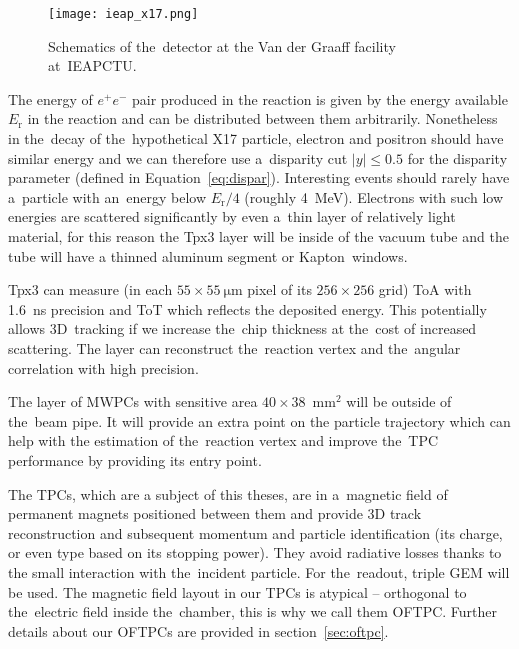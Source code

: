 			\begin{figure}
				\centering
				\texttt{[image: ieap\_x17.png]}
				\caption{Schematics of the~detector at the Van der Graaff facility at~\ac{IEAPCTU}.}
				\label{fig:ieap}
			\end{figure}
		
		The energy of $e^+e^-$ pair produced in the reaction is given by the energy available $E_\text{r}$ in the reaction and can be distributed between them arbitrarily. Nonetheless in the~decay of the~hypothetical X17 particle, electron and positron should have similar energy and we can therefore use a~disparity cut $|y| \leq 0.5$ for the disparity parameter (defined in Equation~\ref{eq:dispar}). Interesting events should rarely have a~particle with an~energy below $E_\text{r}/4$ (roughly 4~MeV). Electrons with such low energies are scattered significantly by even a~thin layer of relatively light material, for this reason the \ac{Tpx3} layer will be inside of the vacuum tube and the tube will have a thinned aluminum segment or Kapton\texttrademark\ windows.
		
		\ac{Tpx3} can measure (in each $55\times55~\mathrm{\mu m}$ pixel of its $256\times256$ grid) \ac{ToA} with 1.6~ns precision and \ac{ToT} which reflects the deposited energy. This potentially allows 3D~tracking if we increase the~chip thickness at the~cost of increased scattering. The layer can reconstruct the~reaction vertex and the~angular correlation with high precision.
		
		The layer of \ac{MWPC}s with sensitive area $40\times38$~mm$^2$ will be outside of the~beam pipe. It will provide an extra point on the particle trajectory which can help with the estimation of the~reaction vertex and improve the~\ac{TPC} performance by providing its entry point.
		
		The \ac{TPC}s, which are a subject of this theses, are in a~magnetic field of permanent magnets positioned between them and provide 3D track reconstruction and subsequent momentum and particle identification (its charge, or even type based on its stopping power). They avoid radiative losses thanks to the small interaction with the~incident particle. For the~readout, triple \ac{GEM} will be used. The magnetic field layout in our \ac{TPC}s is atypical -- orthogonal to the~electric field inside the~chamber, this is why we call them \acf{OFTPC}. Further details about our \ac{OFTPC}s are provided in section~\ref{sec:oftpc}.